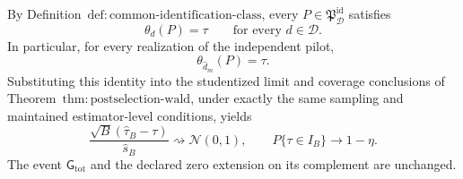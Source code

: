 By Definition~\(\mathrm{def{:}common\text{-}identification\text{-}class}\), every \(P\in\mathfrak P_{\mathcal D}^{\mathrm{id}}\) satisfies
\[
 \theta_d(P)=\tau\qquad\text{for every }d\in\mathcal D.
\]
In particular, for every realization of the independent pilot,
\[
 \theta_{\widehat d_m}(P)=\tau.
\]
Substituting this identity into the studentized limit and coverage conclusions of Theorem~\(\mathrm{thm{:}postselection\text{-}wald}\), under exactly the same sampling and maintained estimator-level conditions, yields
\[
 \frac{\sqrt B(\widehat\tau_B-\tau)}{\widehat s_B}
 \rightsquigarrow\mathcal N(0,1),
 \qquad
 P\{\tau\in I_B\}\longrightarrow1-\eta.
\]
The event \(\mathsf G_{\mathrm{tot}}\) and the declared zero extension on its complement are unchanged.